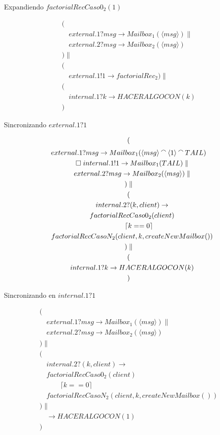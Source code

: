 \documentclass[fleqn]{article}
\newcommand{\myList}[1]{\langle #1 \rangle}
\newcommand{\myCons}[0]{\mathbin{\raise 0.8ex\hbox{$\smallfrown$}}}
\begin{document}
Expandiendo $factorialRecCaso0_2(1)$

\begin{gather*}
( \\ 
\quad external.1?msg \rightarrow Mailbox_1(\myList{msg}) \parallel \\
\quad external.2?msg \rightarrow Mailbox_2(\myList{msg})  \\
) \parallel \\
( \\
\quad external.1!1 \rightarrow factorialRec_2
) \parallel \\
( \\
\quad internal.1?k \rightarrow HACERALGOCON(k) \\ 
)
\end{gather*}

Sincronizando $external.1?1$

\begin{gather*}
( \\ 
external.1?msg \rightarrow Mailbox_1(\myList{msg} \myCons \myList{1} \myCons TAIL) \\ 
\quad \square \; internal.1!1 \rightarrow Mailbox_1(TAIL)  \parallel \\
\quad external.2?msg \rightarrow Mailbox_2(\myList{msg}) \parallel \\
) \parallel \\
( \\
\quad internal.2?(k,client) \rightarrow \\
\quad factorialRecCaso0_2(client) \\
\quad \qquad \lceil k == 0 \rceil \\
\quad factorialRecCasoN_2(client, k, createNewMailbox()) \\
) \parallel \\
( \\
\quad internal.1?k \rightarrow HACERALGOCON(k) \\ 
)
\end{gather*}

Sincronizando en $internal.1?1$

\begin{gather*}
( \\ 
\quad external.1?msg \rightarrow Mailbox_1(\myList{msg}) \parallel \\
\quad external.2?msg \rightarrow Mailbox_2(\myList{msg})  \\
) \parallel \\
( \\
\quad internal.2?(k,client) \rightarrow \\
\quad factorialRecCaso0_2(client) \\
\quad \qquad \lceil k == 0 \rceil \\
\quad factorialRecCasoN_2(client, k, createNewMailbox()) \\
) \parallel \\
\quad  \rightarrow HACERALGOCON(1) \\ 
)
\end{gather*}


{}

\end{document}
